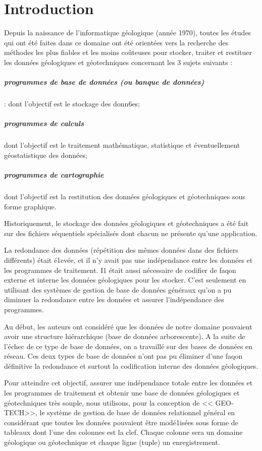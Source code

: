 \chapter*{Introduction}
Depuis la naissance de l'informatique géologique (année 1970), toutes les études qui ont été faites dans ce
domaine ont été orientées vers la recherche des
méthodes les plus fiables et les moins coûteuses pour
stocker, traiter et restituer les données géologiques et
géotechniques concernant les 3 sujets suivants :
\paragraph{programmes de base de données (ou banque de
données) }: dont l'objectif est le stockage des donn6es;

\paragraph{programmes de calculs}
 dont l'objectif est le traitement mathématique, statistique et éventuellement géostatistique des données;

\paragraph{programmes de cartographie}
dont l'objectif est la restitution des données géologiques et géotechniques
sous forme graphique.
\par
Historiquement, le stockage des données géologiques
et géotechniques a été fait sur des fichiers séquentiels
spécialisés dont chacun ne présente qu'une application.
\par
La redondance des données (répétition des mêmes
données dans des fichiers différents) était é1evée, et il
n'y avait pas une indépendance entre les données et les
programmes de traitement. I1 était aussi nécessaire de
codifier de faqon externe et interne les données géologiques pour les stocker. C'est seulement en utilisant
des systèmes de gestion de base de données généraux
qu'on a pu diminuer la redondance entre les données
et assurer l'indépendance des programmes.
\par
 Au début,
les auteurs ont considéré que les données de notre
domaine pouvaient avoir une structure hiérarchique
(base de données arborescente). A la suite de l'échec
de ce type de base de données, on a travaillé sur des
bases de données en réseau. Ces deux types de base de
données n'ont pas pu éliminer d'une faqon définitive
la redondance et surtout la codification interne des
données géologiques.
\cite{tunis}
\par
Pour atteindre cet objectif, assurer une indépendance
totale entre les données et les programmes de traitement et obtenir une base de données géologiques et
géotechniques très souple, nous utilisons, pour la
conception de << GEO-TECH>>, le système
de gestion de base de données relationnel général en
considérant que toutes les données pouvaient être
modé1isées sous forme de tableaux  dont
l'une des colonnes est la clef. Chaque colonne sera un
domaine géologique ou géotechnique et chaque ligne (tuple)
un enregistrement.